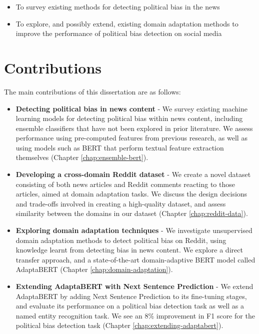 \begin{itemize}
    \item To survey existing methods for detecting political bias in the news
    \item To explore, and possibly extend, existing domain adaptation methods to improve the performance of political bias detection on social media
\end{itemize}

\section{Contributions}

The main contributions of this dissertation are as follows:

\begin{itemize}
    \item \textbf{Detecting political bias in news content} - We survey existing machine learning models for detecting political bias within news content, including ensemble classifiers that have not been explored in prior literature. We assess performance using pre-computed features from previous research, as well as using models such as BERT that perform textual feature extraction themselves (Chapter \ref{chap:ensemble-bert}).
    \item \textbf{Developing a cross-domain Reddit dataset} - We create a novel dataset consisting of both news articles and Reddit comments reacting to those articles, aimed at domain adaptation tasks. We discuss the design decisions and trade-offs involved in creating a high-quality dataset, and assess similarity between the domains in our dataset (Chapter \ref{chap:reddit-data}).
    \item \textbf{Exploring domain adaptation techniques} - We investigate unsupervised domain adaptation methods to detect political bias on Reddit, using knowledge learnt from detecting bias in news content. We explore a direct transfer approach, and a state-of-the-art domain-adaptive BERT model called AdaptaBERT (Chapter \ref{chap:domain-adaptation}).
    \item \textbf{Extending AdaptaBERT with Next Sentence Prediction} - We extend AdaptaBERT by adding Next Sentence Prediction to its fine-tuning stages, and evaluate its performance on a political bias detection task as well as a named entity recognition task. We see an 8\% improvement in F1 score for the political bias detection task (Chapter \ref{chap:extending-adaptabert}).
\end{itemize}
